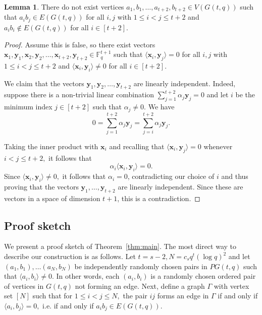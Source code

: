 \documentclass{article}
\theoremstyle{plain}
\newtheorem{lemma}[theorem]{Lemma}
\theoremstyle{definition}
\newtheorem{lemma}{Lemma}
\newcommand{\bF}{\mathbb{F}}
\newcommand{\bx}{\mathbf{x}}
\newcommand{\by}{\mathbf{y}}
\begin{document}
\begin{lemma} \label{lem:Hs-free}
    There do not exist vertices $a_1, b_1, \dots, a_{t+2}, b_{t+2} \in V(G(t, q))$ such that $a_ib_j \in E(G(t, q))$ for all $i, j$ with $1 \le i < j \le t+2$ and $a_i b_i \not\in E(G(t, q))$ for all $i \in [t+2]$.
\end{lemma}
\begin{proof}
    Assume this is false, so there exist vectors $\bx_1, \by_1, \bx_2, \by_2, \dots, \bx_{t+2}, \by_{t+2} \in \bF_q^{t+1}$ such that $\langle \bx_i, \by_j \rangle = 0$ for all $i, j$ with $1 \le i < j \le t+2$ and $\langle \bx_i, \by_i \rangle \neq 0$ for all $i \in [t+2]$.
    
    We claim that the vectors $\by_1, \by_2, \dots, \by_{t+2}$ are linearly independent. Indeed, suppose there is a non-trivial linear combination $\sum_{j=1}^{t+2} \alpha_j \by_j = 0$ and let $i$ be the minimum index $j \in [t+2]$ such that $\alpha_j \neq 0$. We have
    \[ 0 = \sum_{j=1}^{t+2} \alpha_j \by_j = \sum_{j=i}^{t+2} \alpha_j \by_j. \]

    Taking the inner product with $\bx_i$ and recalling that $\langle \bx_i, \by_j \rangle = 0$ whenever $i < j \le t+2,$ it follows that
    \[ \alpha_i \langle \bx_i, \by_i \rangle = 0. \]
    Since $\langle \bx_i, \by_i \rangle \neq 0,$ it follows that $\alpha_i = 0$, contradicting our choice of $i$ and thus proving that the vectors $\by_1, \dots, \by_{t+2}$ are linearly independent. Since these are vectors in a space of dimension $t+1$, this is a contradiction.
\end{proof}

\subsection{Proof sketch} \label{subsec:sketch}
We present a proof sketch of Theorem~\ref{thm:main}. The most direct way to describe our construction is as follows. Let $t=s-2, N = c_s q^t (\log q)^2$ and let $(a_1, b_1), \dots (a_N, b_N)$ be independently randomly chosen pairs in $PG(t, q)$ such that $\langle a_i, b_i \rangle \neq 0$. In other words, each $(a_i, b_i)$ is a randomly chosen ordered pair of vertices in $G(t, q)$ not forming an edge. Next, define a graph $\Gamma$ with vertex set $[N]$ such that for $1 \le i < j \le N,$ the pair $ij$ forms an edge in $\Gamma$ if and only if $\langle a_i, b_j \rangle = 0,$ i.e. if and only if $a_i b_j \in E(G(t, q)).$ 
\end{document}
